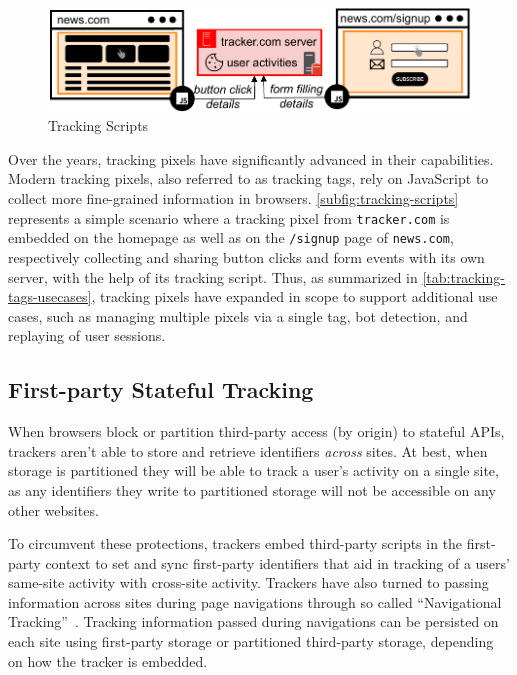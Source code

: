 \begin{figure}[htbp]
    \vspace{-2mm}
    \centering
    \includegraphics[width=1\linewidth]{figures/tracking-mechanisms-tracking-tags.pdf}
    \caption{Tracking Scripts}
    \label{subfig:tracking-scripts}
    \vspace{-2mm}
\end{figure}

Over the years, tracking pixels have significantly advanced in their capabilities.
%
Modern tracking pixels, also referred to as tracking tags, rely on JavaScript to collect more fine-grained information in browsers. 
%
\autoref{subfig:tracking-scripts} represents a simple scenario where a tracking pixel from \texttt{tracker.com} is embedded on the homepage as well as on the \texttt{/signup} page of \texttt{news.com}, respectively collecting and sharing button clicks and form events with its own server, with the help of its tracking script.
%
Thus, as summarized in \autoref{tab:tracking-tags-usecases}, tracking pixels have expanded in scope to support additional use cases, such as managing multiple pixels via a single tag, bot detection, and replaying of user sessions.





\subsection{First-party Stateful Tracking}
\label{sec:fp-stateful}

When browsers block or partition third-party access (by origin) to stateful APIs, trackers aren’t able to store and retrieve identifiers \textit{across} sites. 
%
At best, when storage is partitioned they will be able to track a user’s activity on a single site, as any identifiers they write to partitioned storage will not be accessible on any other websites. 
%

To circumvent these protections, trackers embed third-party scripts in the first-party context to set and sync first-party identifiers that aid in tracking of a users’ same-site activity with cross-site activity. 
%
Trackers have also turned to passing information across sites during page navigations through so called ``Navigational Tracking''~\cite{snyderNavigationalTrackingMitigations2024}. 
%
Tracking information passed during navigations can be persisted on each site using first-party storage or partitioned third-party storage, depending on how the tracker is embedded. 
%

